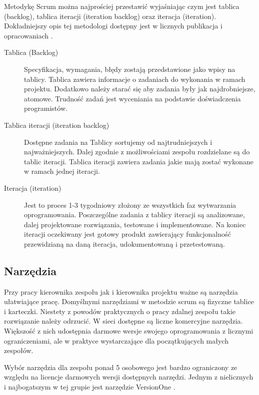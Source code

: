 Metodykę Scrum można najprościej przestawić wyjaśniając czym jest tablica (backlog), tablica iteracji (iteration backlog) oraz iteracja (iteration). Dokładniejszy opis tej metodologi dostępny jest w licznych publikacja i opracowaniach \cite{scrumalliance} \cite{scrum_wiki}. 

\begin{description}

\item[Tablica (Backlog)] Specyfikacja, wymagania, błędy zostają przedstawione jako wpisy na tablicy. Tablica zawiera informacje o zadaniach do wykonania w ramach projektu. Dodatkowo należy starać się aby zadania były jak najdrobniejsze, atomowe. Trudność zadań jest wyceniania na podstawie doświadczenia programistów.

\item[Tablica iteracji (iteration backlog)] Dostępne zadania na Tablicy sortujemy od najtrudniejszych i najważniejszych. Dalej zgodnie z możliwościami zespołu rozdzielane są do tablic iteracji. Tablica iteracji zawiera zadania jakie mają zostać wykonane w ramach jednej iteracji. 

\item[Iteracja (iteration)] Jest to proces 1-3 tygodniowy złożony ze wszystkich faz wytwarzania oprogramowania. Poszczególne zadania z tablicy iteracji są analizowane, dalej projektowane rozwiązania, testowane i implementowane. Na koniec iteracji oczekiwany jest gotowy produkt zawierający funkcjonalność przewidzianą na daną iteracja, udokumentowaną i przetestowaną.

\end{description}

\subsection{Narzędzia}

Przy pracy kierownika zespołu jak i kierownika projektu ważne są narzędzia ułatwiające pracę. Domyślnymi narzędziami w metodzie scrum są fizyczne tablice i karteczki. Niestety z powodów praktycznych o pracy zdalnej zespołu takie rozwiązanie należy odrzucić. W sieci dostępne są liczne komercyjne narzędzia. Większość z nich udostępnia darmowe wersje swojego oprogramowania z licznymi ograniczeniami, ale w praktyce wystarczające dla początkujących małych zespołów.  


Wybór narzędzia dla zespołu ponad 5 osobowego jest bardzo ograniczony ze względu na licencje darmowych wersji dostępnych narzędzi. Jednym z nielicznych i najbogatszym w tej grupie jest narzędzie VersionOne \cite{versionone}.
 
